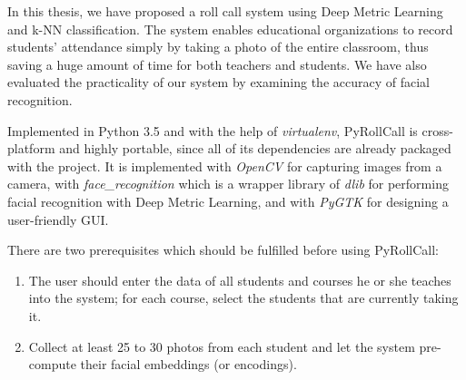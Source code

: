 In this thesis, we have proposed a roll call system using Deep Metric Learning and k-NN classification.
The system enables educational organizations to record students' attendance simply by taking a photo of
the entire classroom, thus saving a huge amount of time for both teachers and students.
We have also evaluated the practicality of our system by examining the accuracy of facial recognition.
\vspace{0.5cm}

Implemented in Python 3.5 and with the help of \emph{virtualenv}, PyRollCall is cross-platform and highly portable,
since all of its dependencies are already packaged with the project. It is implemented with \emph{OpenCV}
for capturing images from a camera, with \emph{face\_recognition} which is a wrapper library of \emph{dlib}
for performing facial recognition with Deep Metric Learning, and with \emph{PyGTK} for designing a user-friendly GUI.
\vspace{0.5cm}

There are two prerequisites which should be fulfilled before using PyRollCall:

\begin{enumerate}
  \item The user should enter the data of all students and courses he or she teaches into the system; for each course, select the students that are currently taking it.
  \item Collect at least 25 to 30 photos from each student and let the system pre-compute their facial embeddings (or encodings).
\end{enumerate}
